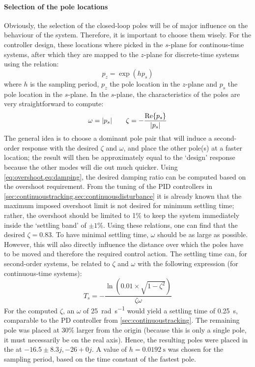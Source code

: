 \paragraph{Selection of the pole locations} Obviously, the selection of the closed-loop poles will be of major influence on the behaviour of the system. Therefore, it is important to choose them wisely. For the controller design, these locations where picked in the $s$-plane for continous-time systems, after which they are mapped to the $z$-plane for discrete-time systems using the relation:
$$ p_z = \exp(hp_s)$$
where $h$ is the sampling period, $p_z$ the pole location in the $z$-plane and $p_s$ the pole location in the $s$-plane. In the $s$-plane, the characteristics of the poles are very straightforward to compute:
$$ \omega = \abs{p_s} \qquad \zeta = -\frac{\Re{p_s}}{\abs{p_s}}$$
The general idea is to choose a dominant pole pair that will induce a second-order response with the desired $\zeta$ and $\omega$, and place the other pole(s) at a faster location; the result will then be approximately equal to the `design' response because the other modes will die out much quicker.
Using \cref{eq:overshoot,eq:damping}, the desired damping ratio can be computed based on the overshoot requirement. From the tuning of the PID controllers in \cref{sec:continuoustracking,sec:continuousdisturbance} it is already known that the maximum imposed overshoot limit is not desired for minimum settling time; rather, the overshoot should be limited to 1\% to keep the system immediately inside the `settling band' of $\pm 1\%$. Using these relations, one can find that the desired $\zeta = 0.83$. To have minimal settling time, $\omega$ should be as large as possible. However, this will also directly influence the distance over which the poles have to be moved and therefore the required control action. The settling time can, for second-order systems, be related to $\zeta$ and $\omega$ with the following expression (for continuous-time systems): \cite{nise}
$$ T_s = -\frac{\ln(0.01\times\sqrt{1 - \zeta^2})}{\zeta\omega}$$
For the computed $\zeta$, an $\omega$ of \SI{25}{\radian\per\second} would yield a settling time of \SI{0.25}{\second}, comparable to the PD controller from \cref{sec:continuoustracking}. The remaining pole was placed at 30\% larger from the origin (because this is only a single pole, it must necessarily be on the real axis).
Hence, the resulting poles were placed in the at $-16.5 \pm 8.3j, -26 + 0j$. A value of $h = \SI{0.0192}{\second}$ was chosen for the sampling period, based on the time constant of the fastest pole.

